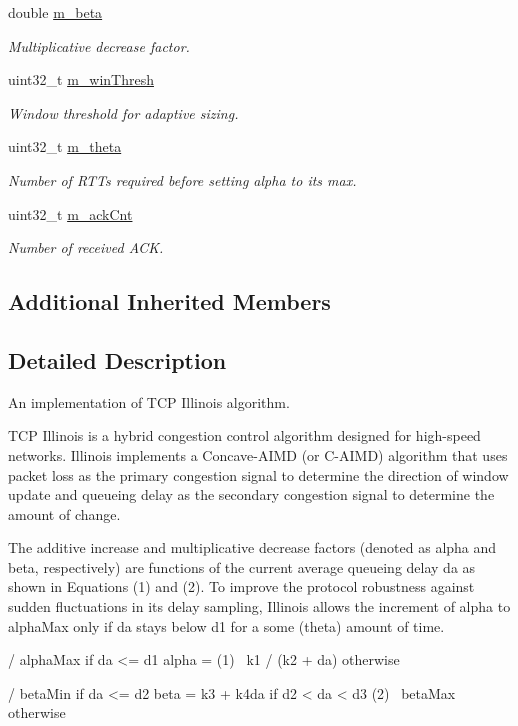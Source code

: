 \begin{DoxyCompactItemize}
double \hyperlink{classns3_1_1TcpIllinois_a0d605879dbf76bb97647d9e993e78a59}{m\+\_\+beta}
\begin{DoxyCompactList}\small\item\em Multiplicative decrease factor. \end{DoxyCompactList}\item 
uint32\+\_\+t \hyperlink{classns3_1_1TcpIllinois_a57917764f34d9810d239423d2ad3b924}{m\+\_\+win\+Thresh}
\begin{DoxyCompactList}\small\item\em Window threshold for adaptive sizing. \end{DoxyCompactList}\item 
uint32\+\_\+t \hyperlink{classns3_1_1TcpIllinois_aa612862174116f2e03372322e7f45e51}{m\+\_\+theta}
\begin{DoxyCompactList}\small\item\em Number of R\+T\+Ts required before setting alpha to its max. \end{DoxyCompactList}\item 
uint32\+\_\+t \hyperlink{classns3_1_1TcpIllinois_a0f824c49e11b05c4db9a02046e80d850}{m\+\_\+ack\+Cnt}
\begin{DoxyCompactList}\small\item\em Number of received A\+CK. \end{DoxyCompactList}\end{DoxyCompactItemize}
\subsection*{Additional Inherited Members}


\subsection{Detailed Description}
An implementation of T\+CP Illinois algorithm. 

T\+CP Illinois is a hybrid congestion control algorithm designed for high-\/speed networks. Illinois implements a Concave-\/\+A\+I\+MD (or C-\/\+A\+I\+MD) algorithm that uses packet loss as the primary congestion signal to determine the direction of window update and queueing delay as the secondary congestion signal to determine the amount of change.

The additive increase and multiplicative decrease factors (denoted as alpha and beta, respectively) are functions of the current average queueing delay da as shown in Equations (1) and (2). To improve the protocol robustness against sudden fluctuations in its delay sampling, Illinois allows the increment of alpha to alpha\+Max only if da stays below d1 for a some (theta) amount of time. \begin{DoxyVerb}                         / alphaMax          if da <= d1
                 alpha =                                         (1)
                         \ k1 / (k2 + da)    otherwise

                        / betaMin            if da <= d2
                 beta =   k3 + k4da          if d2 < da < d3      (2)
                        \ betaMax            otherwise
\end{DoxyVerb}


